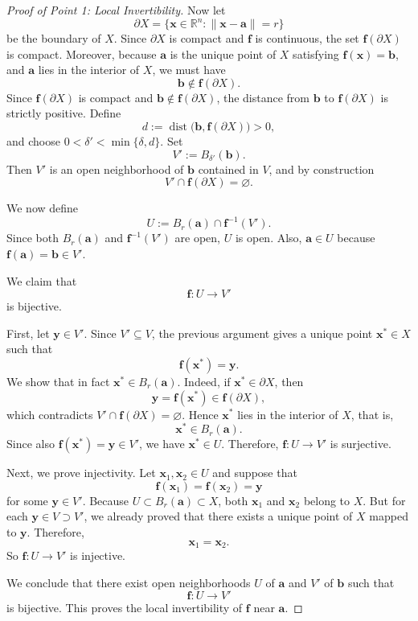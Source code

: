 \documentclass{article}
\begin{document}
\begin{proof}[Proof of Point 1: Local Invertibility]
Now let
\[
\partial X=\{\mathbf{x}\in\mathbb{R}^n:\|\mathbf{x}-\mathbf{a}\|=r\}
\]
be the boundary of $X$. Since $\partial X$ is compact and $\mathbf{f}$ is continuous, the set $\mathbf{f}(\partial X)$ is compact. Moreover, because $\mathbf{a}$ is the unique point of $X$ satisfying $\mathbf{f}(\mathbf{x})=\mathbf{b}$, and $\mathbf{a}$ lies in the interior of $X$, we must have
\[
\mathbf{b}\notin \mathbf{f}(\partial X).
\]
Since $\mathbf{f}(\partial X)$ is compact and $\mathbf{b}\notin \mathbf{f}(\partial X)$, the distance from $\mathbf{b}$ to $\mathbf{f}(\partial X)$ is strictly positive. Define
\[
d:=\operatorname{dist}\bigl(\mathbf{b},\mathbf{f}(\partial X)\bigr)>0,
\]
and choose $0<\delta'<\min\{\delta,d\}$. Set
\[
V':=B_{\delta'}(\mathbf{b}).
\]
Then $V'$ is an open neighborhood of $\mathbf{b}$ contained in $V$, and by construction
\[
V'\cap \mathbf{f}(\partial X)=\varnothing.
\]

We now define
\[
U:=B_r(\mathbf{a})\cap \mathbf{f}^{-1}(V').
\]
Since both $B_r(\mathbf{a})$ and $\mathbf{f}^{-1}(V')$ are open, $U$ is open. Also, $\mathbf{a}\in U$ because $\mathbf{f}(\mathbf{a})=\mathbf{b}\in V'$.

We claim that
\[
\mathbf{f}:U\to V'
\]
is bijective.

First, let $\mathbf{y}\in V'$. Since $V'\subseteq V$, the previous argument gives a unique point $\mathbf{x}^*\in X$ such that
\[
\mathbf{f}(\mathbf{x}^*)=\mathbf{y}.
\]
We show that in fact $\mathbf{x}^*\in B_r(\mathbf{a})$. Indeed, if $\mathbf{x}^*\in\partial X$, then
\[
\mathbf{y}=\mathbf{f}(\mathbf{x}^*)\in \mathbf{f}(\partial X),
\]
which contradicts $V'\cap \mathbf{f}(\partial X)=\varnothing$. Hence $\mathbf{x}^*$ lies in the interior of $X$, that is,
\[
\mathbf{x}^*\in B_r(\mathbf{a}).
\]
Since also $\mathbf{f}(\mathbf{x}^*)=\mathbf{y}\in V'$, we have $\mathbf{x}^*\in U$. Therefore, $\mathbf{f}:U\to V'$ is surjective.

Next, we prove injectivity. Let $\mathbf{x}_1,\mathbf{x}_2\in U$ and suppose that
\[
\mathbf{f}(\mathbf{x}_1)=\mathbf{f}(\mathbf{x}_2)=\mathbf{y}
\]
for some $\mathbf{y}\in V'$. Because $U\subset B_r(\mathbf{a})\subset X$, both $\mathbf{x}_1$ and $\mathbf{x}_2$ belong to $X$. But for each $\mathbf{y}\in V\supset V'$, we already proved that there exists a unique point of $X$ mapped to $\mathbf{y}$. Therefore,
\[
\mathbf{x}_1=\mathbf{x}_2.
\]
So $\mathbf{f}:U\to V'$ is injective.

We conclude that there exist open neighborhoods $U$ of $\mathbf{a}$ and $V'$ of $\mathbf{b}$ such that
\[
\mathbf{f}:U\to V'
\]
is bijective. This proves the local invertibility of $\mathbf{f}$ near $\mathbf{a}$.

\end{proof}
\end{document}
